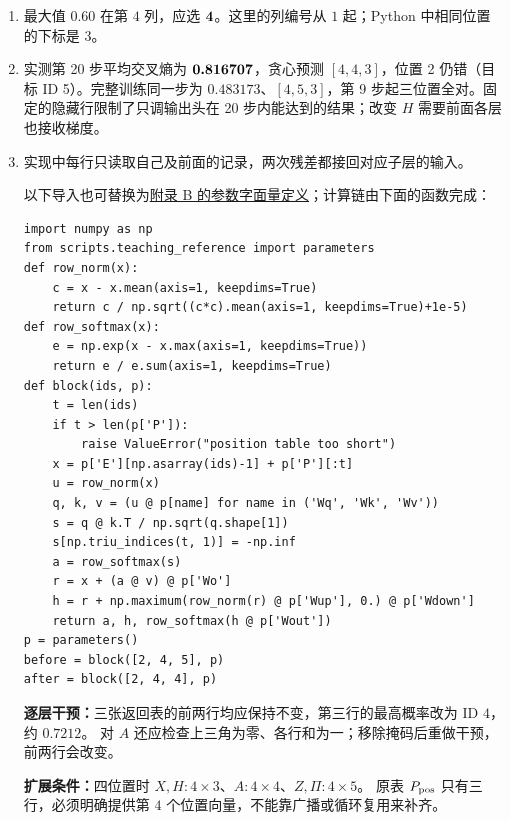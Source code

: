 \begin{enumerate}[label={},leftmargin=4.8em,itemsep=4pt]
\item[\textbf{\hyperref[exercise:probability-row-greedy]{C-074.}}] \leavevmode{}\label{solution:C-074}\label{solution:probability-row-greedy}最大值 $0.60$ 在第 $4$ 列，应选 $\boldsymbol{4}$。这里的列编号从 $1$ 起；Python 中相同位置的下标是 $3$。
\item[\textbf{\hyperref[exercise:output-head-only-training]{C-075.}}] \leavevmode{}\label{solution:C-075}\label{solution:output-head-only-training}实测第 20 步平均交叉熵为 $\boldsymbol{0.816707}$，贪心预测 $[4,4,3]$，位置 2 仍错（目标 ID 5）。完整训练同一步为 $0.483173$、$[4,5,3]$，第 9 步起三位置全对。固定的隐藏行限制了只调输出头在 20 步内能达到的结果；改变 $H$ 需要前面各层也接收梯度。
\item[\textbf{\hyperref[exercise:causal-input-change]{C-076.}}] \leavevmode{}\label{solution:C-076}\label{solution:causal-input-change}实现中每行只读取自己及前面的记录，两次残差都接回对应子层的输入。
\par{}以下导入也可替换为\hyperref[app:parameter-literal]{附录 B 的参数字面量定义}；计算链由下面的函数完成：\par\nobreak
\begin{samepage}\begin{verbatim}
import numpy as np
from scripts.teaching_reference import parameters
def row_norm(x):
    c = x - x.mean(axis=1, keepdims=True)
    return c / np.sqrt((c*c).mean(axis=1, keepdims=True)+1e-5)
def row_softmax(x):
    e = np.exp(x - x.max(axis=1, keepdims=True))
    return e / e.sum(axis=1, keepdims=True)
def block(ids, p):
    t = len(ids)
    if t > len(p['P']):
        raise ValueError("position table too short")
    x = p['E'][np.asarray(ids)-1] + p['P'][:t]
    u = row_norm(x)
    q, k, v = (u @ p[name] for name in ('Wq', 'Wk', 'Wv'))
    s = q @ k.T / np.sqrt(q.shape[1])
    s[np.triu_indices(t, 1)] = -np.inf
    a = row_softmax(s)
    r = x + (a @ v) @ p['Wo']
    h = r + np.maximum(row_norm(r) @ p['Wup'], 0.) @ p['Wdown']
    return a, h, row_softmax(h @ p['Wout'])
p = parameters()
before = block([2, 4, 5], p)
after = block([2, 4, 4], p)
\end{verbatim}\end{samepage}
\textbf{逐层干预：}三张返回表的前两行均应保持不变，第三行的最高概率改为 ID $4$，约 $0.7212$。
对 $A$ 还应检查上三角为零、各行和为一；移除掩码后重做干预，前两行会改变。
\par\textbf{扩展条件：}四位置时 $X,H:4\times3$、$A:4\times4$、$Z,\Pi:4\times5$。
原表 $P_{\rm pos}$ 只有三行，必须明确提供第 $4$ 个位置向量，不能靠广播或循环复用来补齐。
\end{enumerate}
